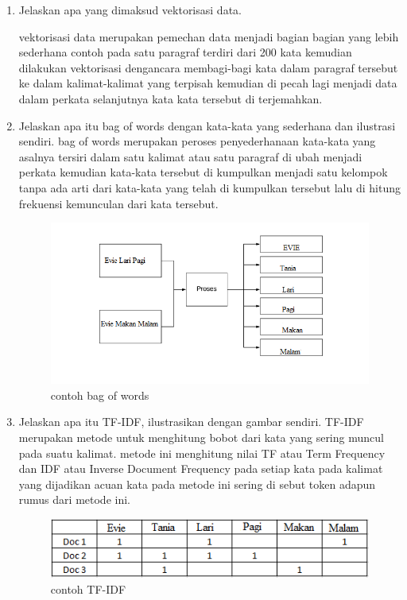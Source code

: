 \begin{enumerate}
\item Jelaskan apa yang dimaksud vektorisasi data.\par
vektorisasi data merupakan pemechan data menjadi bagian bagian yang lebih sederhana contoh pada satu paragraf terdiri dari 200 kata kemudian dilakukan vektorisasi dengancara membagi-bagi kata dalam paragraf tersebut ke dalam kalimat-kalimat yang terpisah kemudian di pecah lagi menjadi data dalam perkata selanjutnya kata kata tersebut di terjemahkan.

\item Jelaskan apa itu bag of words dengan kata-kata yang sederhana dan ilustrasi sendiri.
 bag of words merupakan peroses penyederhanaan kata-kata yang asalnya tersiri dalam satu kalimat atau satu paragraf di ubah menjadi perkata kemudian kata-kata tersebut di kumpulkan menjadi satu kelompok tanpa ada arti dari kata-kata yang telah di kumpulkan tersebut lalu di hitung frekuensi kemunculan dari kata tersebut.
 
\begin{figure}[ht]
\centering
\includegraphics[scale=0.2]{figures/1174051/4/4.PNG}
\caption{contoh bag of words}
\label{contoh}
\end{figure}

\item Jelaskan apa itu TF-IDF, ilustrasikan dengan gambar sendiri.
 TF-IDF merupakan metode untuk menghitung bobot dari kata yang sering muncul pada suatu kalimat. metode ini menghitung nilai TF atau Term Frequency dan IDF atau Inverse Document Frequency pada setiap kata pada kalimat yang dijadikan acuan kata pada metode ini sering di sebut token adapun rumus dari metode ini.
 
\begin{figure}[ht]
\centering
\includegraphics[scale=0.2]{figures/1174051/4/5.PNG}
\caption{contoh TF-IDF}
\label{contoh}
\end{figure}

\end{enumerate}


